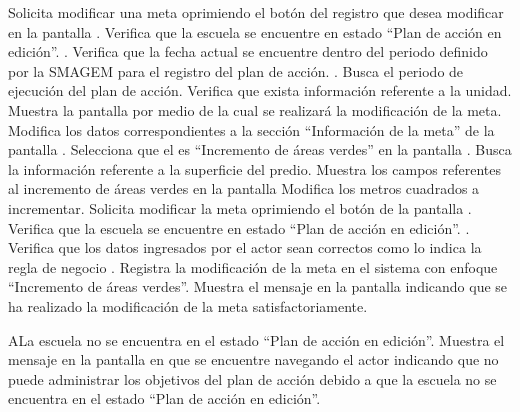 \begin{UCtrayectoria}
	\UCpaso[\UCactor] Solicita modificar una meta oprimiendo el botón \botEdit del registro que desea modificar en la pantalla .
	\UCpaso[\UCsist] Verifica que la escuela se encuentre en  estado ``Plan de acción en edición''. .
    \UCpaso[\UCsist] Verifica que la fecha actual se encuentre dentro del periodo definido por la SMAGEM para el registro del plan de acción. .	
	\UCpaso[\UCsist] Busca el periodo de ejecución del plan de acción.
	\UCpaso[\UCsist] Verifica que exista información referente a la unidad. 
	\UCpaso[\UCsist] Muestra la pantalla  por medio de la cual se realizará la modificación de la meta.
	\UCpaso[\UCactor] Modifica los datos correspondientes a la sección ``Información de la meta'' de la pantalla . \label{cupb2:ingresaDatos}
	\UCpaso[\UCactor] Selecciona que el  es ``Incremento de áreas verdes'' en la pantalla . 
	\UCpaso[\UCsist] Busca la información referente a la superficie del predio.
	\UCpaso[\UCsist] Muestra los campos referentes al incremento de áreas verdes en la pantalla 
	\UCpaso[\UCactor] Modifica los metros cuadrados a incrementar.
	\UCpaso[\UCactor] Solicita modificar la meta oprimiendo el botón  de la pantalla . 
		\UCpaso[\UCsist] Verifica que la escuela se encuentre en  estado ``Plan de acción en edición''. .
	\UCpaso[\UCsist] Verifica que los datos ingresados por el actor sean correctos como lo indica la regla de negocio .   
	\UCpaso[\UCsist] Registra la modificación de la meta en el sistema con enfoque ``Incremento de áreas verdes''.
	\UCpaso[\UCsist] Muestra el mensaje  en la pantalla  indicando que se ha realizado la modificación de la meta satisfactoriamente. \label{cupb2:muestraMensaje}
\end{UCtrayectoria}
 
\begin{UCtrayectoriaA}{A}{La escuela no se encuentra en el estado ``Plan de acción en edición''.}
    \UCpaso[\UCsist] Muestra el mensaje  en la pantalla en que se encuentre navegando el actor indicando que no puede administrar los objetivos del plan de acción debido a que la escuela no se encuentra en el estado ``Plan de acción en edición''. 
 \end{UCtrayectoriaA}
 
